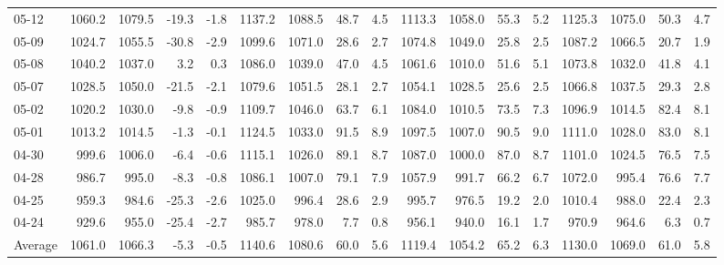 \begin{threeparttable}
{\begin{tabular}{lrrrrrrrrrrrrrrrr}
  05-12 & 1060.2 & 1079.5 &      -19.3 &           -1.8 & 1137.2 & 1088.5 &       48.7 &            4.5 & 1113.3 & 1058.0 &       55.3 &            5.2 & 1125.3 & 1075.0 &        50.3 &              4.7 \\
  05-09 & 1024.7 & 1055.5 &      -30.8 &           -2.9 & 1099.6 & 1071.0 &       28.6 &            2.7 & 1074.8 & 1049.0 &       25.8 &            2.5 & 1087.2 & 1066.5 &        20.7 &              1.9 \\
  05-08 & 1040.2 & 1037.0 &        3.2 &            0.3 & 1086.0 & 1039.0 &       47.0 &            4.5 & 1061.6 & 1010.0 &       51.6 &            5.1 & 1073.8 & 1032.0 &        41.8 &              4.1 \\
  05-07 & 1028.5 & 1050.0 &      -21.5 &           -2.1 & 1079.6 & 1051.5 &       28.1 &            2.7 & 1054.1 & 1028.5 &       25.6 &            2.5 & 1066.8 & 1037.5 &        29.3 &              2.8 \\
  05-02 & 1020.2 & 1030.0 &       -9.8 &           -0.9 & 1109.7 & 1046.0 &       63.7 &            6.1 & 1084.0 & 1010.5 &       73.5 &            7.3 & 1096.9 & 1014.5 &        82.4 &              8.1 \\
  05-01 & 1013.2 & 1014.5 &       -1.3 &           -0.1 & 1124.5 & 1033.0 &       91.5 &            8.9 & 1097.5 & 1007.0 &       90.5 &            9.0 & 1111.0 & 1028.0 &        83.0 &              8.1 \\
  04-30 &  999.6 & 1006.0 &       -6.4 &           -0.6 & 1115.1 & 1026.0 &       89.1 &            8.7 & 1087.0 & 1000.0 &       87.0 &            8.7 & 1101.0 & 1024.5 &        76.5 &              7.5 \\
  04-28 &  986.7 &  995.0 &       -8.3 &           -0.8 & 1086.1 & 1007.0 &       79.1 &            7.9 & 1057.9 &  991.7 &       66.2 &            6.7 & 1072.0 &  995.4 &        76.6 &              7.7 \\
  04-25 &  959.3 &  984.6 &      -25.3 &           -2.6 & 1025.0 &  996.4 &       28.6 &            2.9 &  995.7 &  976.5 &       19.2 &            2.0 & 1010.4 &  988.0 &        22.4 &              2.3 \\
  04-24 &  929.6 &  955.0 &      -25.4 &           -2.7 &  985.7 &  978.0 &        7.7 &            0.8 &  956.1 &  940.0 &       16.1 &            1.7 &  970.9 &  964.6 &         6.3 &              0.7 \\
Average & 1061.0 & 1066.3 &       -5.3 &           -0.5 & 1140.6 & 1080.6 &       60.0 &            5.6 & 1119.4 & 1054.2 &       65.2 &            6.3 & 1130.0 & 1069.0 &        61.0 &              5.8 \\

\end{tabular}}
\end{threeparttable}
